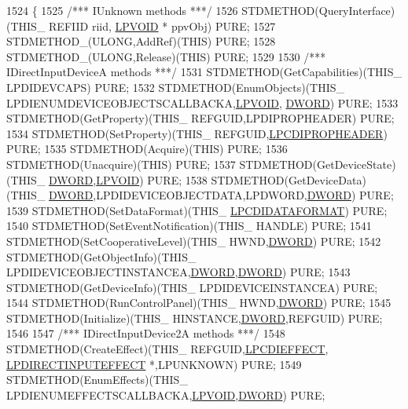 \begin{DoxyCode}
1524 \{
1525     \textcolor{comment}{/*** IUnknown methods ***/}
1526     STDMETHOD(QueryInterface)(THIS\_ REFIID riid, \hyperlink{a00003_ae611cd6871649dbfe37273a0253d5e61}{LPVOID} * ppvObj) PURE;
1527     STDMETHOD\_(ULONG,AddRef)(THIS) PURE;
1528     STDMETHOD\_(ULONG,Release)(THIS) PURE;
1529 
1530     \textcolor{comment}{/*** IDirectInputDeviceA methods ***/}
1531     STDMETHOD(GetCapabilities)(THIS\_ LPDIDEVCAPS) PURE;
1532     STDMETHOD(EnumObjects)(THIS\_ LPDIENUMDEVICEOBJECTSCALLBACKA,\hyperlink{a00003_ae611cd6871649dbfe37273a0253d5e61}{LPVOID},
      \hyperlink{a00003_a50e15ae51c87ae06ab29c8148cb5f36c}{DWORD}) PURE;
1533     STDMETHOD(GetProperty)(THIS\_ REFGUID,LPDIPROPHEADER) PURE;
1534     STDMETHOD(SetProperty)(THIS\_ REFGUID,\hyperlink{a00003_aa73246465a32c316894f99e088564911}{LPCDIPROPHEADER}) PURE;
1535     STDMETHOD(Acquire)(THIS) PURE;
1536     STDMETHOD(Unacquire)(THIS) PURE;
1537     STDMETHOD(GetDeviceState)(THIS\_ \hyperlink{a00003_a50e15ae51c87ae06ab29c8148cb5f36c}{DWORD},\hyperlink{a00003_ae611cd6871649dbfe37273a0253d5e61}{LPVOID}) PURE;
1538     STDMETHOD(GetDeviceData)(THIS\_ \hyperlink{a00003_a50e15ae51c87ae06ab29c8148cb5f36c}{DWORD},LPDIDEVICEOBJECTDATA,LPDWORD,\hyperlink{a00003_a50e15ae51c87ae06ab29c8148cb5f36c}{DWORD}) PURE;
1539     STDMETHOD(SetDataFormat)(THIS\_ \hyperlink{a00003_ab7e0c3254f09795a4a2176cac228ba7d}{LPCDIDATAFORMAT}) PURE;
1540     STDMETHOD(SetEventNotification)(THIS\_ HANDLE) PURE;
1541     STDMETHOD(SetCooperativeLevel)(THIS\_ HWND,\hyperlink{a00003_a50e15ae51c87ae06ab29c8148cb5f36c}{DWORD}) PURE;
1542     STDMETHOD(GetObjectInfo)(THIS\_ LPDIDEVICEOBJECTINSTANCEA,\hyperlink{a00003_a50e15ae51c87ae06ab29c8148cb5f36c}{DWORD},\hyperlink{a00003_a50e15ae51c87ae06ab29c8148cb5f36c}{DWORD}) PURE;
1543     STDMETHOD(GetDeviceInfo)(THIS\_ LPDIDEVICEINSTANCEA) PURE;
1544     STDMETHOD(RunControlPanel)(THIS\_ HWND,\hyperlink{a00003_a50e15ae51c87ae06ab29c8148cb5f36c}{DWORD}) PURE;
1545     STDMETHOD(Initialize)(THIS\_ HINSTANCE,\hyperlink{a00003_a50e15ae51c87ae06ab29c8148cb5f36c}{DWORD},REFGUID) PURE;
1546 
1547     \textcolor{comment}{/*** IDirectInputDevice2A methods ***/}
1548     STDMETHOD(CreateEffect)(THIS\_ REFGUID,\hyperlink{a00003_a7913240b16286bfdcb811a35a982b236}{LPCDIEFFECT},
      \hyperlink{a00003_ac8278f319038d7db709c5ea828830fb9}{LPDIRECTINPUTEFFECT} *,LPUNKNOWN) PURE;
1549     STDMETHOD(EnumEffects)(THIS\_ LPDIENUMEFFECTSCALLBACKA,\hyperlink{a00003_ae611cd6871649dbfe37273a0253d5e61}{LPVOID},\hyperlink{a00003_a50e15ae51c87ae06ab29c8148cb5f36c}{DWORD}) PURE;

\end{DoxyCode}
